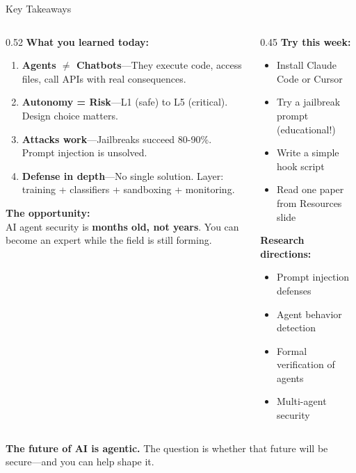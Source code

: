\documentclass[aspectratio=169,9pt]{beamer}
\begin{document}
\begin{frame}{Key Takeaways}
\begin{columns}[T]
\begin{column}{0.52\textwidth}
\textbf{What you learned today:}
\begin{enumerate}\scriptsize
  \item \textbf{Agents $\neq$ Chatbots}---They execute code, access files, call APIs with real consequences.
  \item \textbf{Autonomy = Risk}---L1 (safe) to L5 (critical). Design choice matters.
  \item \textbf{Attacks work}---Jailbreaks succeed 80-90\%. Prompt injection is unsolved.
  \item \textbf{Defense in depth}---No single solution. Layer: training + classifiers + sandboxing + monitoring.
\end{enumerate}

\vspace{0.2em}
\begin{redbox}
\textbf{The opportunity:}\\
\scriptsize AI agent security is \textbf{months old, not years}. You can become an expert while the field is still forming.
\end{redbox}
\end{column}

\begin{column}{0.45\textwidth}
\textbf{Try this week:}
\begin{itemize}\scriptsize
  \item Install Claude Code or Cursor
  \item Try a jailbreak prompt (educational!)
  \item Write a simple hook script
  \item Read one paper from Resources slide
\end{itemize}

\vspace{0.2em}
\textbf{Research directions:}
\begin{itemize}\scriptsize
  \item Prompt injection defenses
  \item Agent behavior detection
  \item Formal verification of agents
  \item Multi-agent security
\end{itemize}
\end{column}
\end{columns}

\begin{graybox}
\small\textbf{The future of AI is agentic.} The question is whether that future will be secure---and you can help shape it.
\end{graybox}
\end{frame}
\end{document}
